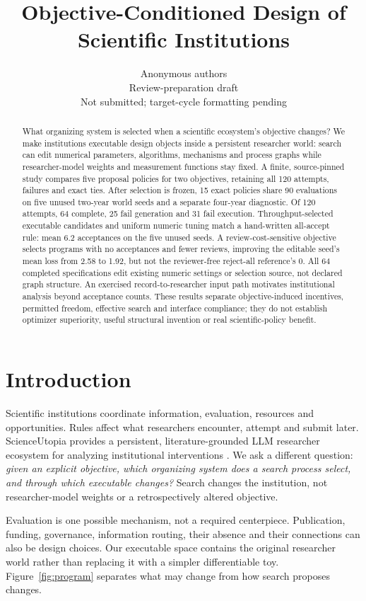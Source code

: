 \documentclass{article}
\title{Objective-Conditioned Design of Scientific Institutions}
\author{Anonymous authors\\Review-preparation draft\\Not submitted; target-cycle formatting pending}
\begin{document}
\maketitle
\begin{abstract}
What organizing system is selected when a scientific ecosystem's objective
changes? We make institutions executable design objects inside a persistent
researcher world: search can edit numerical parameters, algorithms, mechanisms
and process graphs while researcher-model weights and measurement functions
stay fixed. A finite, source-pinned study compares five proposal policies for
two objectives, retaining all 120 attempts, failures and exact ties. After
selection is frozen, 15 exact policies share 90 evaluations on five unused
two-year world seeds and a separate four-year diagnostic. Of 120 attempts, 64
complete, 25 fail generation and 31 fail execution. Throughput-selected
executable candidates and uniform numeric tuning match a hand-written
all-accept rule: mean 6.2 acceptances on the five unused seeds. A review-cost-sensitive
objective selects programs with no acceptances and fewer reviews, improving
the editable seed's mean loss from 2.58 to 1.92, but not the reviewer-free
reject-all reference's 0. All 64 completed specifications edit existing numeric
settings or selection source, not declared graph structure. An exercised
record-to-researcher input path motivates institutional analysis beyond
acceptance counts. These results separate objective-induced incentives,
permitted freedom, effective search and interface compliance; they do not
establish optimizer superiority, useful structural invention or real
scientific-policy benefit.
\end{abstract}

\section{Introduction}
Scientific institutions coordinate information, evaluation, resources and
opportunities. Rules affect what researchers encounter, attempt and submit
later. ScienceUtopia provides a persistent, literature-grounded LLM researcher
ecosystem for analyzing institutional interventions \citep{jin2026scienceutopia}.
We ask a different question: \emph{given an explicit objective, which organizing
system does a search process select, and through which executable changes?}
Search changes the institution, not researcher-model weights or a retrospectively
altered objective.

Evaluation is one possible mechanism, not a required centerpiece. Publication,
funding, governance, information routing, their absence and their connections
can also be design choices. Our executable space contains the original
researcher world rather than replacing it with a simpler differentiable toy.
Figure~\ref{fig:program} separates what may change from how search proposes changes.
\end{document}
